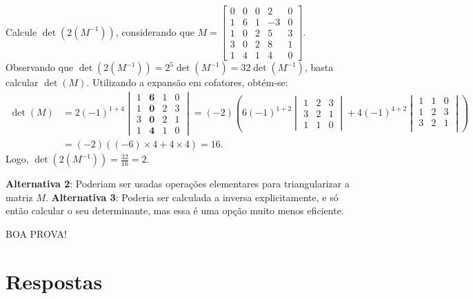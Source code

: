 \documentclass[12pt,a4paper]{article}
\begin{document}
\begin{ExerciseList}
\Exercise[title={2,5}] Calcule $\det{(2 (M^{-1}))}$, considerando que
$M = \begin{bmatrix}
0 & 0 & 0 &  2 & 0\\
1 & 6 & 1 & -3 & 0\\
1 & 0 & 2 &  5 & 3\\
3 & 0 & 2 &  8 & 1\\
1 & 4 & 1 &  4 & 0
\end{bmatrix}$.
\Answer Observando que
$\det{(2 (M^{-1}))}
= 2^5 \det{(M^{-1})}
= 32 \det{(M^{-1})}$,
basta calcular $\det{(M)}$. Utilizando a expansão em cofatores, obtém-se:
\begin{align*}
\det{(M)}
&= 2(-1)^{1+4}\begin{vmatrix}
1 & \textbf{6} & 1 & 0\\
1 & \textbf{0} & 2 & 3\\
3 & \textbf{0} & 2 & 1\\
1 & \textbf{4} & 1 & 0
\end{vmatrix}
= (-2)
\left(
6(-1)^{1+2}
\begin{vmatrix}
1 & 2 & 3\\
3 & 2 & 1\\
1 & 1 & 0
\end{vmatrix}
+ 4(-1)^{4+2}
\begin{vmatrix}
1 & 1 & 0\\
1 & 2 & 3\\
3 & 2 & 1\\
\end{vmatrix}
\right) \\
&=(-2)
\left(
(-6) \times 4
+ 4 \times 4
\right)
= 16.
\end{align*}
Logo, $\det{(2 (M^{-1}))} = \frac{ 32 }{ 16 } = 2$.

\textbf{Alternativa 2}: Poderiam ser usadas operações elementares para triangularizar a matriz $M$.
\textbf{Alternativa 3}: Poderia ser calculada a inversa explicitamente, e só então calcular o seu determinante, mas essa é uma opção muito menos eficiente.
\end{ExerciseList}

\begin{center}
BOA PROVA!
\end{center}

\newpage
\restoregeometry
\section*{Respostas}
\shipoutAnswer
\end{document}
